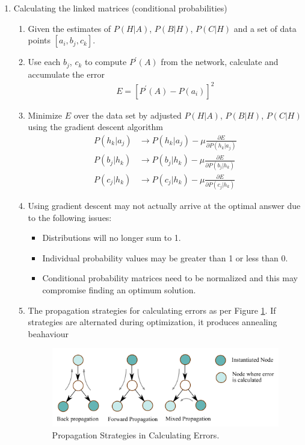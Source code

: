 \documentclass[12pt,twoside]{article}
\begin{document}
\begin{enumerate}
\item Calculating the linked matrices (conditional probabilities)
	\begin{enumerate}
		\item Given the estimates of $P(H\vert A)$, $P(B\vert H)$, $P(C\vert H)$ and a set of data points $[a_i, b_j, c_k]$.
		\item Use each $b_j$, $c_k$ to compute $P^\prime (A)$ from the network, calculate and accumulate the error
			\begin{align*}
				E = [P^\prime (A) - P(a_i)]^2
			\end{align*}
		\item Minimize $E$ over the data set by adjusted $P(H\vert A)$, $P(B\vert H)$, $P(C\vert H)$ using the gradient descent algorithm
			\begin{align*}
				P(h_k \vert a_j) &\rightarrow P(h_k \vert a_j)- \mu \frac{\partial E}{\partial P(h_k \vert a_j)}\\
				P(b_j \vert h_k) &\rightarrow P(b_j \vert h_k) - \mu \frac{\partial E}{\partial P(b_j \vert h_k)}\\
				P(c_j \vert h_k) &\rightarrow P(c_j \vert h_k) - \mu \frac{\partial E}{\partial P(c_j \vert h_k)}
			\end{align*}
		\item Using gradient descent may not actually arrive at the optimal answer due to the following issues:
			\begin{itemize}
				\item Distributions will no longer sum to 1.
				\item Individual probability values may be greater than 1 or less than 0.
				\item Conditional probability matrices need to be normalized and this may compromise finding an optimum solution.
			\end{itemize}					
		\item The propagation strategies for calculating errors as per Figure \ref{fig:PropagationStrategies}. If strategies are alternated during optimization, it produces annealing beahaviour
		
		\begin{figure}[H]		
			\begin{center}
			\includegraphics[width = 0.4\hsize]{./figures/PropagationStrategies.png} %
				\caption{Propagation Strategies in Calculating Errors.}
			\label{fig:PropagationStrategies} %
			\end{center}
		\end{figure}	


\end{enumerate}
\end{enumerate}
\end{document}
